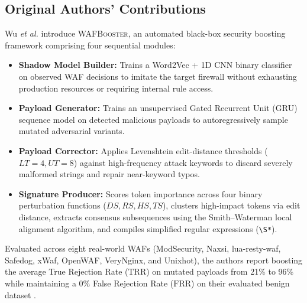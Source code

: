 \documentclass[conference]{IEEEtran}
\newcommand{\WAF}{\textsc{WAF}}
\newcommand{\WAFB}{\textsc{WAFBooster}}
\newcommand{\TRR}{\ensuremath{\mathrm{TRR}}}
\newcommand{\FRR}{\ensuremath{\mathrm{FRR}}}
\begin{document}
\subsection{Original Authors' Contributions}
Wu \emph{et al.} \cite{wu2025} introduce \WAFB{}, an automated black-box security boosting framework comprising four sequential modules:
\begin{itemize}
    \item \textbf{Shadow Model Builder:} Trains a Word2Vec + 1D CNN binary classifier on observed \WAF{} decisions to imitate the target firewall without exhausting production resources or requiring internal rule access.
    \item \textbf{Payload Generator:} Trains an unsupervised Gated Recurrent Unit (GRU) sequence model on detected malicious payloads to autoregressively sample mutated adversarial variants.
    \item \textbf{Payload Corrector:} Applies Levenshtein edit-distance thresholds ($LT=4, UT=8$) against high-frequency attack keywords to discard severely malformed strings and repair near-keyword typos.
    \item \textbf{Signature Producer:} Scores token importance across four binary perturbation functions ($DS, RS, HS, TS$), clusters high-impact tokens via edit distance, extracts consensus subsequences using the Smith--Waterman local alignment algorithm, and compiles simplified regular expressions (\texttt{\textbackslash S*}).
\end{itemize}
Evaluated across eight real-world \WAF{}s (ModSecurity, Naxsi, lua-resty-waf, Safedog, xWaf, OpenWAF, VeryNginx, and Unixhot), the authors report boosting the average True Rejection Rate (\TRR{}) on mutated payloads from 21\% to 96\% while maintaining a 0\% False Rejection Rate (\FRR{}) on their evaluated benign dataset \cite{wu2025}.
\end{document}
